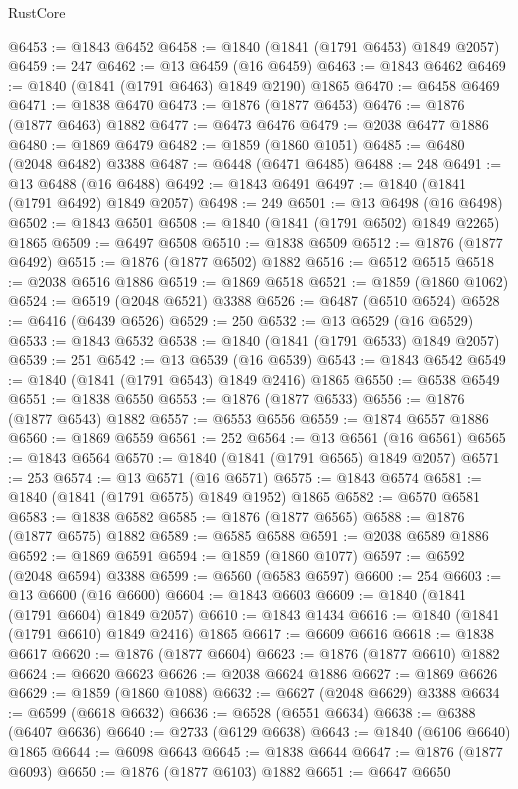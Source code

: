 \begin{lexlean}{RustCore}
\begin{coremodule}
@6453 := @1843 @6452
@6458 := @1840 (@1841 (@1791 @6453) @1849 @2057)
@6459 := 247
@6462 := @13 @6459 (@16 @6459)
@6463 := @1843 @6462
@6469 := @1840 (@1841 (@1791 @6463) @1849 @2190) @1865
@6470 := @6458 @6469
@6471 := @1838 @6470
@6473 := @1876 (@1877 @6453)
@6476 := @1876 (@1877 @6463) @1882
@6477 := @6473 @6476
@6479 := @2038 @6477 @1886
@6480 := @1869 @6479
@6482 := @1859 (@1860 @1051)
@6485 := @6480 (@2048 @6482) @3388
@6487 := @6448 (@6471 @6485)
@6488 := 248
@6491 := @13 @6488 (@16 @6488)
@6492 := @1843 @6491
@6497 := @1840 (@1841 (@1791 @6492) @1849 @2057)
@6498 := 249
@6501 := @13 @6498 (@16 @6498)
@6502 := @1843 @6501
@6508 := @1840 (@1841 (@1791 @6502) @1849 @2265) @1865
@6509 := @6497 @6508
@6510 := @1838 @6509
@6512 := @1876 (@1877 @6492)
@6515 := @1876 (@1877 @6502) @1882
@6516 := @6512 @6515
@6518 := @2038 @6516 @1886
@6519 := @1869 @6518
@6521 := @1859 (@1860 @1062)
@6524 := @6519 (@2048 @6521) @3388
@6526 := @6487 (@6510 @6524)
@6528 := @6416 (@6439 @6526)
@6529 := 250
@6532 := @13 @6529 (@16 @6529)
@6533 := @1843 @6532
@6538 := @1840 (@1841 (@1791 @6533) @1849 @2057)
@6539 := 251
@6542 := @13 @6539 (@16 @6539)
@6543 := @1843 @6542
@6549 := @1840 (@1841 (@1791 @6543) @1849 @2416) @1865
@6550 := @6538 @6549
@6551 := @1838 @6550
@6553 := @1876 (@1877 @6533)
@6556 := @1876 (@1877 @6543) @1882
@6557 := @6553 @6556
@6559 := @1874 @6557 @1886
@6560 := @1869 @6559
@6561 := 252
@6564 := @13 @6561 (@16 @6561)
@6565 := @1843 @6564
@6570 := @1840 (@1841 (@1791 @6565) @1849 @2057)
@6571 := 253
@6574 := @13 @6571 (@16 @6571)
@6575 := @1843 @6574
@6581 := @1840 (@1841 (@1791 @6575) @1849 @1952) @1865
@6582 := @6570 @6581
@6583 := @1838 @6582
@6585 := @1876 (@1877 @6565)
@6588 := @1876 (@1877 @6575) @1882
@6589 := @6585 @6588
@6591 := @2038 @6589 @1886
@6592 := @1869 @6591
@6594 := @1859 (@1860 @1077)
@6597 := @6592 (@2048 @6594) @3388
@6599 := @6560 (@6583 @6597)
@6600 := 254
@6603 := @13 @6600 (@16 @6600)
@6604 := @1843 @6603
@6609 := @1840 (@1841 (@1791 @6604) @1849 @2057)
@6610 := @1843 @1434
@6616 := @1840 (@1841 (@1791 @6610) @1849 @2416) @1865
@6617 := @6609 @6616
@6618 := @1838 @6617
@6620 := @1876 (@1877 @6604)
@6623 := @1876 (@1877 @6610) @1882
@6624 := @6620 @6623
@6626 := @2038 @6624 @1886
@6627 := @1869 @6626
@6629 := @1859 (@1860 @1088)
@6632 := @6627 (@2048 @6629) @3388
@6634 := @6599 (@6618 @6632)
@6636 := @6528 (@6551 @6634)
@6638 := @6388 (@6407 @6636)
@6640 := @2733 (@6129 @6638)
@6643 := @1840 (@6106 @6640) @1865
@6644 := @6098 @6643
@6645 := @1838 @6644
@6647 := @1876 (@1877 @6093)
@6650 := @1876 (@1877 @6103) @1882
@6651 := @6647 @6650

\end{coremodule}
\end{lexlean}
